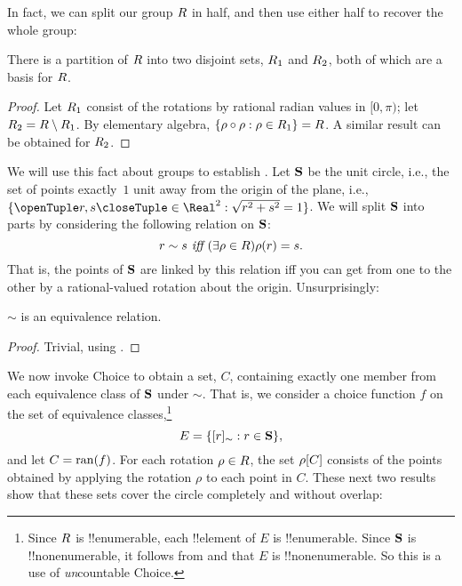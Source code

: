 \documentclass[../../../include/open-logic-section]{subfiles}
\begin{document}
In fact, we can split our group $R$
in half, and then use either half to recover the whole group:

\begin{lem}
There is a partition of $R$ into two disjoint sets,
$R_{1}$ and $R_{2}$, both of which are a
basis for $R$. 
\end{lem}

\begin{proof}
Let $R_{1}$ consist of the rotations by rational radian
values in $[0, \pi)$; let $R_{2} = R
\setminus R_1$. By elementary algebra,
$\{ \rho \circ \rho : \rho \in R_1 \} =
R$. A similar result can be obtained for
$R_2$.
\end{proof}

We will use this fact about groups to establish .
Let $\mathbf{S}$ be the unit circle, i.e., the set of points
exactly~$1$ unit away from the origin of the plane, i.e.,
$\Setabs{\tuple{r,s} \in \Real^2}{\sqrt{r^2+s^2}=1}$. We will split
$\mathbf{S}$ into parts by considering the following relation on
$\mathbf{S}$:
\[
	r \sim s \emph{ iff }(\exists \rho \in R)\rho(r) = s.
\]
That is, the points of $\mathbf{S}$ are linked by this relation iff you can get from one to the other by a rational-valued rotation about the origin. Unsurprisingly:

\begin{lem}
$\sim$ is an equivalence relation.
\end{lem}

\begin{proof}
Trivial, using . 
\end{proof}

We now invoke Choice to obtain a set, $C$, containing exactly one
member from each equivalence class of $\mathbf{S}$ under $\sim$. That
is, we consider a choice function $f$ on the set of equivalence
classes,\footnote{Since $R$ is !!{enumerable},
each !!{element} of $E$ is !!{enumerable}. Since $\mathbf{S}$ is
!!{nonenumerable}, it follows from  and
 that $E$ is
!!{nonenumerable}. So this is a use of \emph{un}countable Choice.}
\[
	E = \{ [r]_{\sim} : r \in \mathbf{S} \},
\]
and let $C = \mathrm{ran}(f)$. For each rotation $\rho \in R$,
the set $\rho[C]$ consists of the points obtained by
applying the rotation $\rho$ to each point in $C$. These next two
results show that these sets cover the circle completely and without
overlap:
\end{document}
